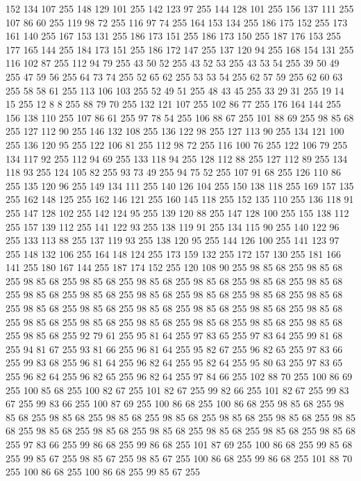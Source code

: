 152 134 107 255 148 129 101 255 142 123 97 255 144 128 101 255 156 137 111 255 107 86 60 255 119 98 72 255 116 97 74 255 164 153 134 255 186 175 152 255 173 161 140 255 167 153 131 255 186 173 151 255 186 173 150 255 187 176 153 255 177 165 144 255 184 173 151 255 186 172 147 255 137 120 94 255 168 154 131 255 116 102 87 255 112 94 79 255 43 50 52 255 43 52 53 255 43 53 54 255 39 50 49 255 47 59 56 255 64 73 74 255 52 65 62 255 53 53 54 255 62 57 59 255 62 60 63 255 58 58 61 255 113 106 103 255 52 49 51 255 48 43 45 255 33 29 31 255 19 14 15 255 12 8 8 255 88 79 70 255 132 121 107 255 102 86 77 255 176 164 144 255 156 138 110 255 107 86 61 255 97 78 54 255 106 88 67 255 101 88 69 255 98 85 68 255 127 112 90 255 146 132 108 255 136 122 98 255 127 113 90 255 134 121 100 255 136 120 95 255 122 106 81 255 112 98 72 255 116 100 76 255 122 106 79 255 134 117 92 255 112 94 69 255 133 118 94 255 128 112 88 255 127 112 89 255
134 118 93 255 124 105 82 255 93 73 49 255 94 75 52 255 107 91 68 255 126 110 86 255 135 120 96 255 149 134 111 255 140 126 104 255 150 138 118 255 169 157 135 255 162 148 125 255 162 146 121 255 160 145 118 255 152 135 110 255 136 118 91 255 147 128 102 255 142 124 95 255 139 120 88 255 147 128 100 255 155 138 112 255 157 139 112 255 141 122 93 255 138 119 91 255 134 115 90 255 140 122 96 255 133 113 88 255 137 119 93 255 138 120 95 255 144 126 100 255 141 123 97 255 148 132 106 255 164 148 124 255 173 159 132 255 172 157 130 255 181 166 141 255 180 167 144 255 187 174 152 255 120 108 90 255 98 85 68 255 98 85 68 255 98 85 68 255 98 85 68 255 98 85 68 255 98 85 68 255 98 85 68 255 98 85 68 255 98 85 68 255 98 85 68 255 98 85 68 255 98 85 68 255 98 85 68 255 98 85 68 255 98 85 68 255 98 85 68 255 98 85 68 255 98 85 68 255 98 85 68 255 98 85 68 255 98 85 68 255 98 85 68 255 98 85 68 255 98 85 68 255 98 85 68 255
98 85 68 255 98 85 68 255 92 79 61 255 95 81 64 255 97 83 65 255 97 83 64 255 99 81 68 255 94 81 67 255 93 81 66 255 96 81 64 255 95 82 67 255 96 82 65 255 97 83 66 255 99 83 68 255 96 81 64 255 96 82 64 255 95 82 64 255 95 80 63 255 97 83 65 255 96 82 64 255 96 82 65 255 96 82 64 255 97 84 66 255 102 88 70 255 100 86 69 255 100 85 68 255 100 82 67 255 101 82 67 255 99 82 66 255 101 82 67 255 99 83 67 255 99 83 66 255 100 87 69 255 100 86 68 255 100 86 68 255 98 85 68 255 98 85 68 255 98 85 68 255 98 85 68 255 98 85 68 255 98 85 68 255 98 85 68 255 98 85 68 255 98 85 68 255 98 85 68 255 98 85 68 255 98 85 68 255 98 85 68 255 98 85 68 255 97 83 66 255 99 86 68 255 99 86 68 255 101 87 69 255 100 86 68 255 99 85 68 255 99 85 67 255 98 85 67 255 98 85 67 255 100 86 68 255 99 86 68 255 101 88 70 255 100 86 68 255 100 86 68 255 99 85 67 255

